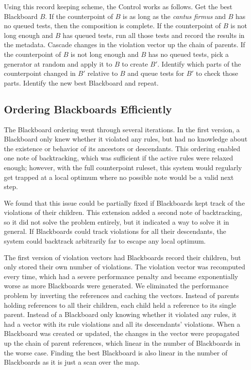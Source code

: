 Using this record keeping scheme, the Control works as follows.
Get the best Blackboard $B$.
If the counterpoint of $B$ is as long as the \emph{cantus firmus} and $B$ has no queued tests, then the composition is complete.
If the counterpoint of $B$ is not long enough and $B$ has queued tests, run all those tests and record the results in the metadata. 
  Cascade changes in the violation vector up the chain of parents.
If the counterpoint of $B$ is not long enough and $B$ has no queued tests, pick a generator at random and apply it to $B$ to create $B'$.
  Identify which parts of the counterpoint changed in $B'$ relative to $B$ and queue tests for $B'$ to check those parts.
Identify the new best Blackboard and repeat.

\subsection{Ordering Blackboards Efficiently}
The Blackboard ordering went through several iterations.
In the first version, a Blackboard only knew whether it violated any rules, but had no knowledge about the existence or behavior of its ancestors or descendants.
This ordering enabled one note of backtracking, which was sufficient if the active rules were relaxed enough;
however, with the full counterpoint ruleset, this system would regularly get trapped at a local optimum where no possible note would be a valid next step.

We found that this issue could be partially fixed if Blackboards kept track of the violations of their children. 
This extension added a second note of backtracking, so it did not solve the problem entirely, but it indicated a way to solve it in general.
If Blackboards could track violations for all their descendants, the system could backtrack arbitrarily far to escape any local optimum.

The first version of violation vectors had Blackboards record their children, but only stored their own number of violations.
The violation vector was recomputed every time, which had a severe performance penalty and became exponentially worse as more Blackboards were generated.
We eliminated the performance problem by inverting the references and caching the vectors.
Instead of parents holding references to all their children, each child held a reference to its single parent.
Instead of a Blackboard only knowing whether it violated any rules, it had a vector with its rule violations and all its descendants' violations.
When a Blackboard was created or updated, the changes in the vector were propagated up the chain of parent references, which linear in the number of Blackboards in the worse case.
Finding the best Blackboard is also linear in the number of Blackboards as it is just a scan over the map.

